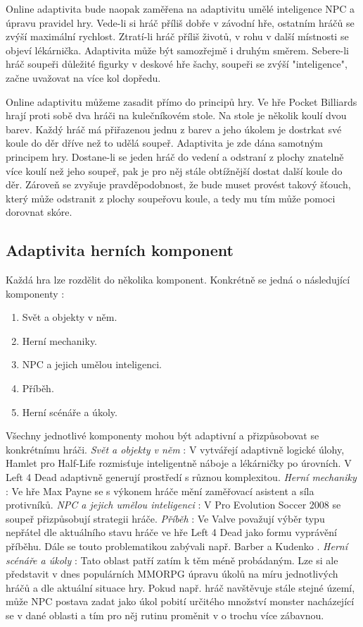 Online adaptivita bude naopak zaměřena na adaptivitu umělé inteligence NPC a úpravu pravidel hry. Vede-li si hráč příliš dobře v závodní hře, ostatním hráčů se zvýší maximální rychlost. Ztratí-li hráč příliš životů, v rohu v další místnosti se objeví lékárnička. Adaptivita může být samozřejmě i druhým směrem. Sebere-li hráč soupeři důležité figurky v deskové hře šachy, soupeři se zvýší "inteligence", začne uvažovat na více kol dopředu. 

Online adaptivitu můžeme zasadit přímo do principů hry. Ve hře Pocket Billiards hrají proti sobě dva hráči na kulečníkovém stole. Na stole je několik koulí dvou barev. Každý hráč má přiřazenou jednu z barev a jeho úkolem je dostrkat své koule do děr dříve než to udělá soupeř. Adaptivita je zde dána samotným principem hry. Dostane-li se jeden hráč do vedení a odstraní z plochy znatelně více koulí než jeho soupeř, pak je pro něj stále obtížnější dostat další koule do děr. Zároveň se zvyšuje pravděpodobnost, že bude muset provést takový šťouch, který může odstranit z plochy soupeřovu koule, a tedy mu tím může pomoci dorovnat skóre.\cite{5}

\subsection{Adaptivita herních komponent}

Každá hra lze rozdělit do několika komponent. Konkrétně se jedná o následující komponenty \cite{16Survey} : 

\begin{enumerate}
	\item Svět a objekty v něm.
	\item Herní mechaniky.
	\item NPC a jejich umělou inteligenci.
	\item Příběh.
	\item Herní scénáře a úkoly.
\end{enumerate}

Všechny jednotlivé komponenty mohou být adaptivní a přizpůsobovat se konkrétnímu hráči. \textit{Svět a objekty v něm} : V \cite{17Evol} vytvářejí adaptivně logické úlohy, Hamlet \cite{20Hun} pro Half-Life rozmisťuje inteligentně náboje a lékárničky po úrovních. V Left 4 Dead adaptivně generují prostředí s různou komplexitou. \textit{Herní mechaniky} : Ve hře Max Payne se s výkonem hráče mění zaměřovací asistent a síla protivníků. \cite{RiskTakers} \textit{NPC a jejich umělou inteligenci} : V Pro Evolution Soccer 2008 se soupeř přizpůsobují strategii hráče. \cite{6} \textit{Příběh} : Ve Valve považují výběr typu nepřátel dle aktuálního stavu hráče ve hře Left 4 Dead jako formu vyprávění příběhu. \cite{2} Dále se touto problematikou zabývali např. Barber a Kudenko \cite{Narratives}. \textit{Herní scénáře a úkoly} : Tato oblast patří zatím k těm méně probádaným. Lze si ale představit v dnes populárních MMORPG úpravu úkolů na míru jednotlivých hráčů a dle aktuální situace hry. Pokud např. hráč navštěvuje stále stejné území, může NPC postava zadat jako úkol pobití určitého množství monster nacházející se v dané oblasti a tím pro něj rutinu proměnit v o trochu více zábavnou.


